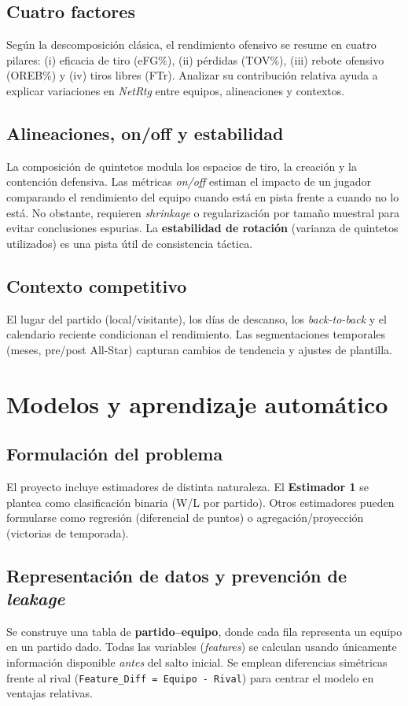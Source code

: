 \subsection*{Cuatro factores}
Según la descomposición clásica, el rendimiento ofensivo se resume en cuatro pilares:
(i) eficacia de tiro (eFG\%), (ii) pérdidas (TOV\%), (iii) rebote ofensivo (OREB\%) y (iv) tiros libres (FTr).
Analizar su contribución relativa ayuda a explicar variaciones en \textit{NetRtg} entre equipos, alineaciones y contextos.

\subsection*{Alineaciones, on/off y estabilidad}
La composición de quintetos modula los espacios de tiro, la creación y la contención defensiva.
Las métricas \textit{on/off} estiman el impacto de un jugador comparando el rendimiento del equipo cuando está en pista
frente a cuando no lo está. No obstante, requieren \textit{shrinkage} o regularización por tamaño muestral para evitar conclusiones espurias.
La \textbf{estabilidad de rotación} (varianza de quintetos utilizados) es una pista útil de consistencia táctica.

\subsection*{Contexto competitivo}
El lugar del partido (local/visitante), los días de descanso, los \textit{back-to-back} y el calendario reciente condicionan el rendimiento.
Las segmentaciones temporales (meses, pre/post All-Star) capturan cambios de tendencia y ajustes de plantilla.

\section{Modelos y aprendizaje automático}\label{sec:modelos}

\subsection*{Formulación del problema}
El proyecto incluye estimadores de distinta naturaleza. El \textbf{Estimador 1} se plantea como clasificación binaria (W/L por partido).
Otros estimadores pueden formularse como regresión (diferencial de puntos) o agregación/proyección (victorias de temporada).

\subsection*{Representación de datos y prevención de \textit{leakage}}
Se construye una tabla de \textbf{partido–equipo}, donde cada fila representa un equipo en un partido dado.
Todas las variables (\textit{features}) se calculan usando únicamente información disponible \emph{antes} del salto inicial.
Se emplean diferencias simétricas frente al rival (\texttt{Feature\_Diff = Equipo - Rival}) para centrar el modelo en ventajas relativas.

